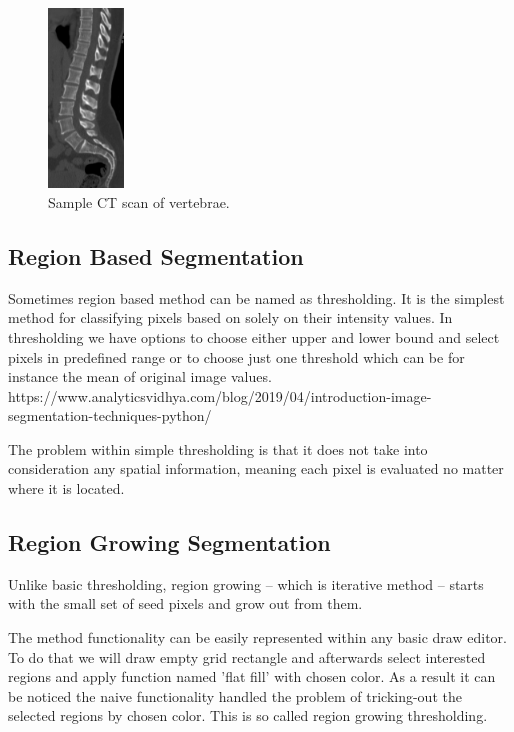 \begin{figure}[h]
    \centering
    \includegraphics[width=2cm]{images/sample_vertebrae.jpeg}
    \caption{Sample CT scan of vertebrae.}
    \label{fig:sample_vertebrae}
\end{figure}


\subsection{Region Based Segmentation}
Sometimes region based method can be named as thresholding. It is the simplest method for classifying pixels based on solely on their intensity values. In thresholding we have options to choose either upper and lower bound and select pixels in predefined range or to choose just one threshold which can be for instance the mean of original image values. 
https://www.analyticsvidhya.com/blog/2019/04/introduction-image-segmentation-techniques-python/


The problem within simple thresholding is that it does not take into consideration any spatial information, meaning each pixel is evaluated no matter where it is located.



\subsection{Region Growing Segmentation}
Unlike basic thresholding, region growing -- which is iterative method -- starts with the small set of seed pixels and grow out from them.

The method functionality can be easily represented within any basic draw editor. To do that we will draw empty grid rectangle and afterwards select interested regions and apply function named 'flat fill' with chosen color. As a result it can be noticed the naive functionality handled the problem of tricking-out the selected regions by chosen color. This is so called region growing thresholding.    

